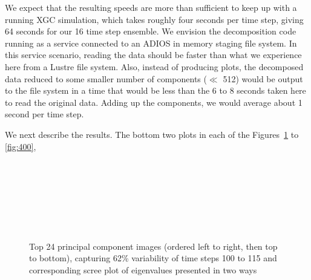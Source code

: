 We expect that the resulting speeds are more than sufficient to keep
up with a running XGC simulation, which takes roughly four seconds per
time step, giving 64 seconds for our 16 time step ensemble. We
envision the decomposition code running as a service connected to an
ADIOS in memory staging file system. In this service scenario, reading
the data should be faster than what we experience here from a Lustre
file system. Also, instead of producing plots, the decomposed data
reduced to some smaller number of components ($\ll$ 512) would be
output to the file system in a time that would be less than the 6 to 8
seconds taken here to read the original data. Adding up the
components, we would average about 1 second per time step.

We next describe the results. The bottom two plots in each of the
Figures~\ref{fig:100} to \ref{fig:400},
\begin{figure}[tbp]
  \begin{center}
    \\
    \\
    \\
    \\
    \\
    \\
  \end{center}
  \caption{Top 24 principal component images (ordered left to right,
    then top to bottom), capturing 62\% variability of time steps 100
    to 115 and corresponding scree plot of eigenvalues presented in
    two ways}
  \label{fig:100}
\end{figure}
